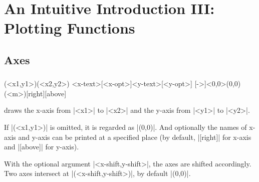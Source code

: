 \chapter{An Intuitive Introduction III: Plotting Functions}
\label{ci:introIII}


\section{Axes}
\label{si:axes}

\subsection{\protect\cmd{\tzaxes}}
\label{ssi:tzaxes}

\begin{tzdef}
(<x1,y1>)(<x2,y2>)
                               {<x-text>}[<x-opt>]{<y-text>}[<y-opt>]
  [->]<0,0>(0,0)(<m>){}[right]{}[above]
\end{tzdef}

\icmd{\tzaxes} draws the x-axis from |<x1>| to |<x2>| and the y-axis from |<y1>| to |<y2>|.

\begin{tzcode}{.3}
\end{tzcode}

If |(<x1,y1>)| is omitted, it is regarded as |(0,0)|.
And optionally the names of x-axis and y-axis can be printed at a specified place (by default, |[right]| for x-axis and |[above]| for y-axis).

\begin{tzcode}{.3}
\end{tzcode}

With the optional argument |<x-shift,y-shift>|, the axes are shifted accordingly. Two axes intersect at |(<x-shift,y-shift>)|, by default |(0,0)|.

\begin{tzcode}{.3}
\end{tzcode}

